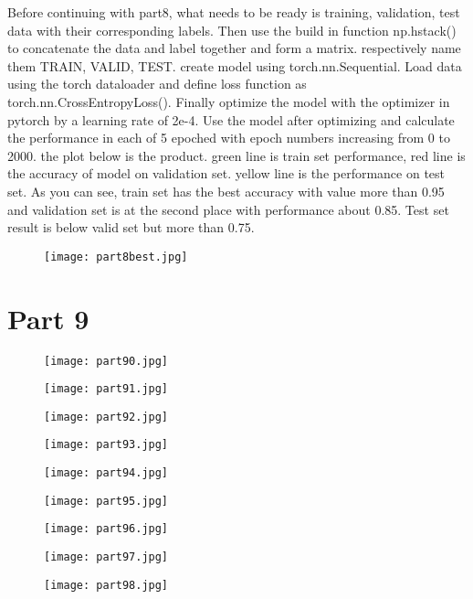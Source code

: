 \documentclass{article}
\begin{document}
Before continuing with part8, what needs to be ready is training, validation, test data with their corresponding labels. Then use the build in function np.hstack() to concatenate the data and label together and form a matrix. respectively name them TRAIN, VALID, TEST. create model using torch.nn.Sequential. Load data using the torch dataloader and define loss function as torch.nn.CrossEntropyLoss(). Finally optimize the model with the optimizer in pytorch by a learning rate of 2e-4. Use the model after optimizing and calculate the performance in each of 5 epoched with epoch numbers increasing from 0 to 2000. the plot below is the product. green line is train set performance, red line is the accuracy of model on validation set. yellow line is the performance on test set. As you can see, train set has the best accuracy with value more than 0.95 and validation set is at the second place with performance about 0.85. Test set result is below valid set but more than 0.75.
\begin{figure}[!htb]
  \texttt{[image: part8best.jpg]}
  \caption*{}\label{fig:part4}
\end{figure}


\vspace{250px}
\section*{Part 9}

\begin{figure}[!htb]
  \texttt{[image: part90.jpg]}
  \caption*{}\label{fig:2}
\endminipage\hfill
{}
  \texttt{[image: part91.jpg]}
  \caption*{}\label{fig:2}
\endminipage\hfill
{}
  \texttt{[image: part92.jpg]}
  \caption*{}\label{fig:2}
\endminipage\hfill
{}
  \texttt{[image: part93.jpg]}
  \caption*{}\label{fig:2}
\endminipage\hfill
{}
  \texttt{[image: part94.jpg]}
  \caption*{}\label{fig:2}
\endminipage\hfill
{}
  \texttt{[image: part95.jpg]}
  \caption*{}\label{fig:100}
\endminipage
\end{figure}

\begin{figure}[!htb]
  \texttt{[image: part96.jpg]}
  \caption*{}\label{fig:2}
\endminipage\hfill
{}
  \texttt{[image: part97.jpg]}
  \caption*{}\label{fig:2}
\endminipage\hfill
{}
  \texttt{[image: part98.jpg]}
  \caption*{}\label{fig:2}
\endminipage
\end{figure}
\end{document}
